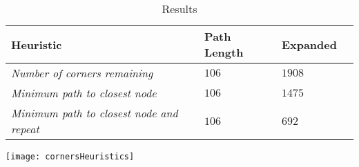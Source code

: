 \begin{itemize}
\begin{table}
\begin{center}
\caption{Results}
\begin{tabular}{|p{9cm}lp{3cm}|p{2cm}|}\hline
\textbf{Heuristic}&\textbf{Path Length} & \textbf{Expanded}  \\ \hline
{\it Number of corners remaining}  & $106$  & $1908$\\ \hline
{\it Minimum path to closest node} & $106$ & $1475$  \\ \hline
{\it Minimum path to closest node and repeat} & $106$ & $692$  \\ \hline
\end{tabular}
\end{center}
\label{tab:first}
\end{table}

\texttt{[image: cornersHeuristics]}
\end{itemize}

